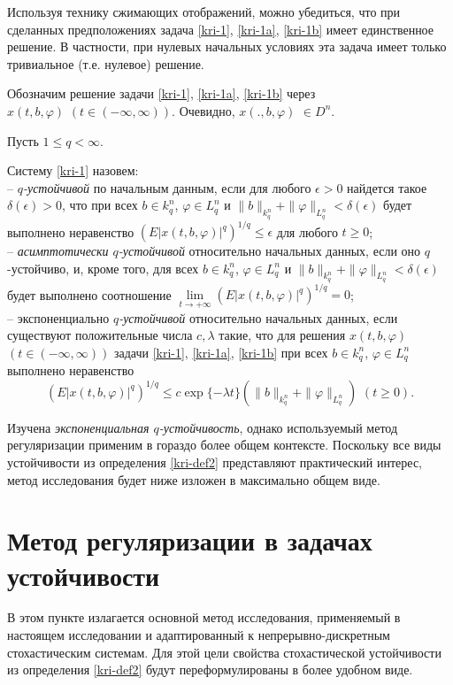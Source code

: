 Используя технику сжимающих отображений, можно убедиться, что при
сделанных предположениях задача \eqref{kri-1}, \eqref{kri-1a}, \eqref{kri-1b} имеет единственное
решение. В частности, при нулевых начальных условиях эта задача
имеет только тривиальное (т.е. нулевое) решение.

Обозначим решение задачи \eqref{kri-1}, \eqref{kri-1a}, \eqref{kri-1b} через $x(t, b,
\varphi)\,\,(t \in (-\infty , \infty ) )$. Очевидно, $x(., b,
\varphi) $ $ \in D^n$.

Пусть $1\le q<\infty$.

\begin{definition}\label{kri-def2} Систему \eqref{kri-1} назовем:\\
\noindent
  -- \textit{$q$-устойчивой} по начальным данным,
 если
 для любого $\epsilon > 0$ найдется такое $\delta (\epsilon)
 > 0$,
 что при всех $b \in k^n_q$, $\varphi \in L^n_q$ и
 $\|b\|_{k^n_q} + \|\varphi \|_{L^n_q} < \delta (\epsilon)$
 будет
 выполнено неравенство $(E|x(t, b, \varphi)|^q)^{1/q} \le
 \epsilon $
 для любого $t \ge 0$;\\
  -- \textit{ асимптотически $q$-устойчивой }относительно
 начальных данных, если
 оно $q$-устойчиво, и, кроме того, для всех $b \in k^n_q$,
 $\varphi \in L^n_q$ и $\|b\|_{k^n_q} + \|\varphi \|_{L^n_q}
 <
 \delta (\epsilon)$ будет выполнено соотношение $\lim \limits_{t  \rightarrow
 +\infty
 }(E|x(t, b, \varphi)|^q)^{1/q} = 0$;\\
-- экспоненциально \textit{ $q$-устойчивой}  относительно
 начальных
 данных, если существуют положительные числа $c, \lambda$
 такие, что
 для решения $x(t, b, \varphi)$ $(t \in (-\infty , \infty ))$ задачи \eqref{kri-1}, \eqref{kri-1a}, \eqref{kri-1b}
 при всех $b \in k^n_q$, $\varphi \in L^n_q$ выполнено неравенство
 $$
 (E|x(t, b, \varphi)|^q)^{1/q} \leq c\exp \{-\lambda
 t\}\left (\|b\|_{k_q^n} + \|\varphi \|_{L^n_q}\right ){\,}
 {\,} (t \geq 0).
 $$
\end{definition}

Изучена \textit{экспоненциальная $q$-устойчивость}, однако
используемый метод регуляризации применим в гораздо более общем
контексте. Поскольку все виды устойчивости из определения \ref{kri-def2}
представляют практический интерес, метод исследования будет ниже
изложен в максимально общем виде.

\smallskip

\section{Метод регуляризации в задачах устойчивости}\label{kri-s2}
В этом пункте излагается основной метод исследования, применяемый в
настоящем исследовании и адаптированный к непрерывно-дискретным стохастическим
системам. Для этой цели свойства стохастической устойчивости из
определения \ref{kri-def2} будут переформулированы в более удобном виде.

